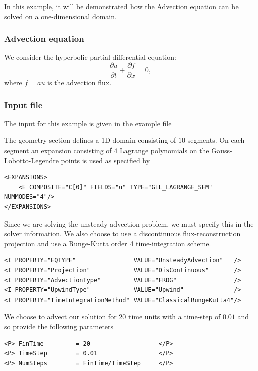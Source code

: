In this example, it will be demonstrated how the Advection equation can be
solved on a one-dimensional domain.

\subsubsection{Advection equation}
We consider the hyperbolic partial differential equation:
\begin{equation}
\dfrac{\partial u}{\partial t} + \dfrac{\partial f}{\partial x} = 0,
\end{equation}
where $f =  a u$ is the advection flux.

\subsubsection{Input file}
The input for this example is given in the example file 

The geometry section defines a 1D domain consisting of $10$ segments. On each
segment an expansion consisting of $4$ Lagrange polynomials on the
Gauss-Lobotto-Legendre points is used as specified by
\begin{lstlisting}[style=XMLStyle]
<EXPANSIONS>
    <E COMPOSITE="C[0]" FIELDS="u" TYPE="GLL_LAGRANGE_SEM" NUMMODES="4"/>
</EXPANSIONS>
\end{lstlisting}

Since we are solving the unsteady advection problem, we must specify this in the
solver information. We also choose to use a discontinuous flux-reconstruction
projection and use a Runge-Kutta order 4 time-integration scheme.
\begin{lstlisting}[style=XMLStyle]
<I PROPERTY="EQTYPE"                VALUE="UnsteadyAdvection"   />
<I PROPERTY="Projection"            VALUE="DisContinuous"       />
<I PROPERTY="AdvectionType"         VALUE="FRDG"                />
<I PROPERTY="UpwindType"            VALUE="Upwind"              />
<I PROPERTY="TimeIntegrationMethod" VALUE="ClassicalRungeKutta4"/>
\end{lstlisting}

We choose to advect our solution for $20$ time units with a time-step of $0.01$
and so provide the following parameters
\begin{lstlisting}[style=XMLStyle]
<P> FinTime         = 20                   </P>
<P> TimeStep        = 0.01                 </P>
<P> NumSteps        = FinTime/TimeStep     </P>
\end{lstlisting}

